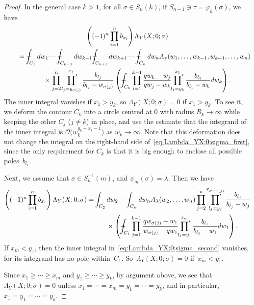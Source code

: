 \documentclass[11pt]{article}
\numberwithin{equation}{section}
\def\Xint#1{\mathchoice
{\XXint\displaystyle\textstyle{#1}}%
{\XXint\textstyle\scriptstyle{#1}}%
{\XXint\scriptstyle\scriptscriptstyle{#1}}%
{\XXint\scriptscriptstyle\scriptscriptstyle{#1}}%
\!\int}
\def\XXint#1#2#3{{\setbox0=\hbox{$#1{#2#3}{\int}$}
\vcenter{\hbox{$#2#3$}}\kern-.5\wd0}}
\def\dashint{\Xint-}
\newcommand{\prodprime}{\sideset{}{'}\prod}
\newcommand{\bigO}{\mathcal{O}}
\begin{document}
\begin{proof}
 In the general case $k > 1$, for all $\sigma \in S_n(k)$, if $S_{n - 1} \ni \tau = \varphi_k(\sigma)$, we have
 \begin{gather}
 \left( (-1)^n \prod^n_{i = 1} b_{x_i} \right) \Lambda_Y(X; 0; \sigma) \nonumber\\
\qquad{} = \dashint_{C_1} dw_1 \dotsi \dashint_{C_{k - 1}} dw_{k - 1} \dashint_{C_{k + 1}} dw_{k + 1} \dotsi \dashint_{C_n} dw_n A_{\tau}(w_1, \dotsc, w_{k - 1}, w_{k + 1}, \dotsc, w_n) \nonumber\\
 \qquad\quad{} \times \prod^n_{j = 2} \prodprime^{x_j}_{l_j = y_{\sigma(j)}} \frac{b_{l_j}}{b_{l_j} - w_{\sigma(j)}} \left( \dashint_{C_k} \prod^{k - 1}_{i = 1} \frac{q w_k - w_j}{q w_j - w_k} \prodprime^{x_1}_{l_1 = y_k} \frac{b_{l_1}}{b_{l_1} - w_k} dw_k \right).\label{eq:Lambda_YX;0;sigma_first}
 \end{gather}
 The inner integral vanishes if $x_1 > y_k$, so $\Lambda_Y(X; 0; \sigma) = 0$ if $x_1 > y_k$. To see it, we deform the contour $C_k$ into a circle centred at $0$ with radius $R_k \to \infty$ while keeping the other $C_j$ ($j \neq k$) in place, and use the estimate that the integrand of the inner integral is $\bigO\big(w^{y_k - x_1 - 1}_k\big)$ as $w_k \to \infty$. Note that this deformation does not change the integral on the right-hand side of~\eqref{eq:Lambda_YX;0;sigma_first}, since the only requirement for $C_k$ is that it is big enough to enclose all possible poles~$b_{l_1}$.

 Next, we assume that $\sigma \in S^{-1}_n(m)$, and $\psi_m(\sigma) = \lambda$. Then we have
 \begin{gather}
 \left( (-1)^n \prod^n_{i = 1} b_{x_i} \right) \Lambda_Y(X; 0; \sigma) = \dashint_{C_2} dw_2 \dotsi \dashint_{C_n} dw_n A_{\lambda}(w_2, \dotsc, w_n) \prod^n_{j = 2} \prodprime^{x_{\sigma^{-1}(j)}}_{l_j = y_j} \frac{b_{l_j}}{b_{l_j} - w_j}\nonumber \\
 \hphantom{\left( (-1)^n \prod^n_{i = 1} b_{x_i} \right) \Lambda_Y(X; 0; \sigma) =}{}
 \times \left( \dashint_{C_1} \prod^{k - 1}_{j = 1} \frac{q w_{\sigma(j)} - w_1}{w_{\sigma(j)} - q w_1} \prodprime^{x_m}_{l_1 = y_1} \frac{b_{l_1}}{b_{l_1} - w_1} dw_1 \right).\label{eq:Lambda_YX;0;sigma_second}
 \end{gather}
 If $x_m < y_1$, then the inner integral in~\eqref{eq:Lambda_YX;0;sigma_second} vanishes, for its integrand has no pole within~$C_1$. So~$\Lambda_Y(X; 0; \sigma) = 0$ if~$x_m < y_1$.

 Since $x_1 \geq \dotsb \geq x_m$ and $y_1 \geq \dotsb \geq y_k$, by argument above, we see that $\Lambda_Y(X; 0; \sigma) = 0$ unless $x_1 = \dotsb = x_m = y_1 = \dotsb = y_k$, and in particular, $x_1 = y_1 = \dotsb = y_k$.


\end{proof}
\end{document}
